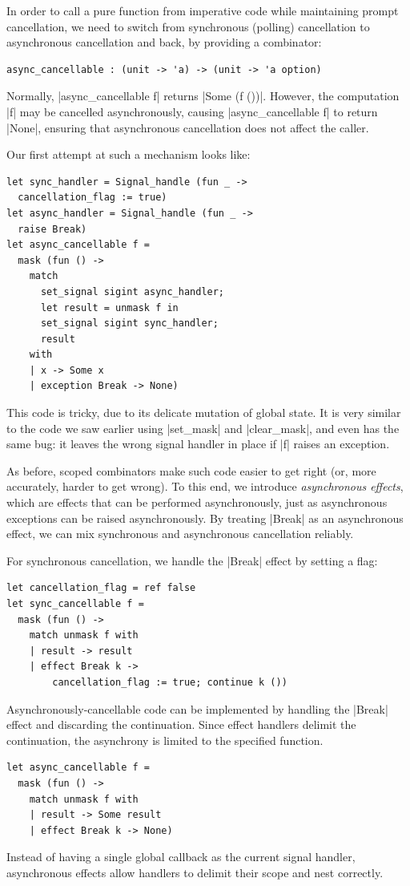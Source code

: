 \documentclass{llncs}
\begin{document}
In order to call a pure function from imperative code while
maintaining prompt cancellation, we need to switch from synchronous
(polling) cancellation to asynchronous cancellation and back, by
providing a combinator:
\begin{lstlisting}
async_cancellable : (unit -> 'a) -> (unit -> 'a option)
\end{lstlisting}
Normally, |async_cancellable f| returns |Some (f ())|. However, the
computation |f| may be cancelled asynchronously, causing
|async_cancellable f| to return |None|, ensuring that asynchronous
cancellation does not affect the caller.

Our first attempt at such a mechanism looks like:
\begin{lstlisting}
let sync_handler = Signal_handle (fun _ ->
  cancellation_flag := true)
let async_handler = Signal_handle (fun _ ->
  raise Break)
let async_cancellable f =
  mask (fun () ->
    match
      set_signal sigint async_handler;
      let result = unmask f in
      set_signal sigint sync_handler;
      result
    with
    | x -> Some x
    | exception Break -> None)
\end{lstlisting}
This code is tricky, due to its delicate
mutation of global state. It is very similar to the code we saw
earlier using |set_mask| and |clear_mask|, and even has the
same bug: it leaves the wrong signal handler in place if
|f| raises an exception.

As before, scoped combinators make such code easier to get right (or,
more accurately, harder to get wrong). To this end, we introduce
\emph{asynchronous effects}, which are effects that can be performed
asynchronously, just as asynchronous exceptions can be raised
asynchronously. By treating |Break| as an asynchronous effect, we
can mix synchronous and asynchronous cancellation reliably.

For synchronous cancellation, we handle
the |Break| effect by setting a flag:
\begin{lstlisting}
let cancellation_flag = ref false
let sync_cancellable f =
  mask (fun () ->
    match unmask f with
    | result -> result
    | effect Break k ->
      	cancellation_flag := true; continue k ())
\end{lstlisting}
Asynchronously-cancellable code can be implemented by handling the
|Break| effect and discarding the continuation. Since effect handlers
delimit the continuation, the asynchrony is limited to the specified
function.
\begin{lstlisting}
let async_cancellable f =
  mask (fun () ->
    match unmask f with
    | result -> Some result
    | effect Break k -> None)
\end{lstlisting}
Instead of having a single global callback as the current signal
handler, asynchronous effects allow handlers to delimit their scope
and nest correctly.
\end{document}
